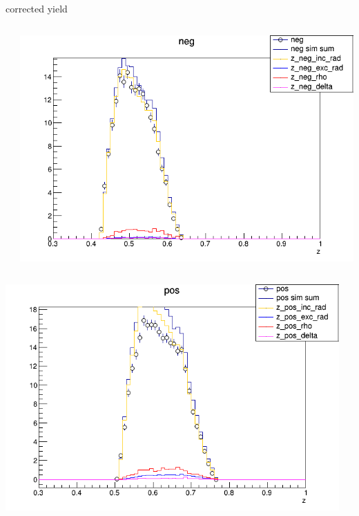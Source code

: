 \begin{frame}{corrected yield}
\begin{columns}
\begin{column}[T]{0.25\textwidth}
\end{column}
\begin{column}[T]{0.25\textwidth}
\includegraphics[width = \textwidth]{results/yield/statistics_corr/yield_x_Q2_z_0.35_4.000_0.50_neg.png}
\end{column}
\end{columns}
\begin{columns}
\begin{column}[T]{0.25\textwidth}
\includegraphics[width = \textwidth]{results/yield/statistics_corr/yield_x_Q2_z_0.35_4.000_0.60_pos.png}
\end{column}
\begin{column}[T]{0.25\textwidth}

\end{column}
\end{columns}
\end{frame}
